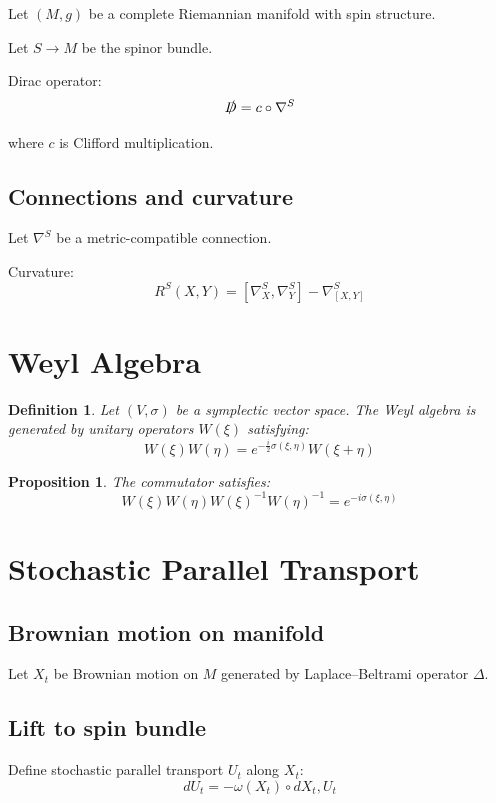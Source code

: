 \documentclass[11pt]{article}
\newtheorem{definition}[theorem]{Definition}
\newtheorem{proposition}[theorem]{Proposition}
\begin{document}
Let $(M,g)$ be a complete Riemannian manifold with spin structure.

Let $S \to M$ be the spinor bundle.

Dirac operator:
\[
\slashed{D} 
= c \circ \nabla^S
\]

where $c$ is Clifford multiplication.

\subsection{Connections and curvature}

Let $\nabla^S$ be a metric-compatible connection.

Curvature:
\[
R^S(X,Y) = [\nabla^S_X, \nabla^S_Y] - \nabla^S_{[X,Y]}
\]

\section{Weyl Algebra}

\begin{definition}
Let $(V,\sigma)$ be a symplectic vector space. The Weyl algebra is generated by unitary operators $W(\xi)$ satisfying:
\[
W(\xi)W(\eta) = e^{-\frac{i}{2}\sigma(\xi,\eta)} W(\xi+\eta)
\]
\end{definition}

\begin{proposition}
The commutator satisfies:
\[
W(\xi)W(\eta)W(\xi)^{-1}W(\eta)^{-1} = e^{-i\sigma(\xi,\eta)}
\]
\end{proposition}

\section{Stochastic Parallel Transport}

\subsection{Brownian motion on manifold}

Let $X_t$ be Brownian motion on $M$ generated by Laplace–Beltrami operator $\Delta$.

\subsection{Lift to spin bundle}

Define stochastic parallel transport $U_t$ along $X_t$:
\[
dU_t = -\omega(X_t) \circ dX_t , U_t
\]
\end{document}
